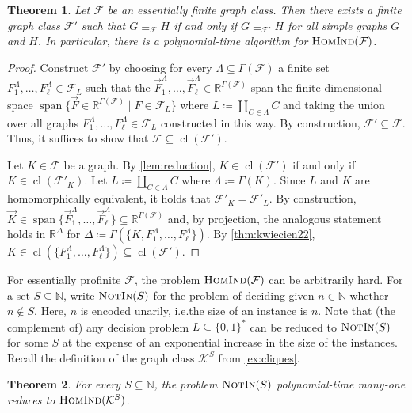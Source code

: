 \documentclass[3p,final]{elsarticle}
\DeclareMathOperator{\spn}{span}
\newcommand{\HomInd}{\textup{\textsc{HomInd}}}
\newcommand{\Mem}{\textup{\textsc{NotIn}}}
\DeclareMathOperator{\cl}{cl}
\newtheorem{theorem}{Theorem}
\begin{document}
	\begin{theorem} \label{thm:finite}
		Let $\mathcal{F}$ be an essentially finite graph class. 
		Then there exists a finite graph class $\mathcal{F}'$ such that $G \equiv_{\mathcal{F}} H$ if and only if $G \equiv_{\mathcal{F}'} H$ for all simple graphs $G$ and $H$.
		In particular, there is a polynomial-time algorithm for $\HomInd(\mathcal{F})$.
	\end{theorem}
	\begin{proof}Construct $\mathcal{F}'$ by choosing for every $\Lambda \subseteq \Gamma(\mathcal{F})$ a
		finite set $F_1^\Lambda, \dots, F_\ell^\Lambda \in \mathcal{F}_L$ such that the 
		$\vec{F}_1^\Lambda, \dots, \vec{F}_\ell^\Lambda \in \mathbb{R}^{\Gamma(\mathcal{F})}$ span the finite-dimensional space $\spn\{\vec{F} \in \mathbb{R}^{\Gamma(\mathcal{F})} \mid F \in \mathcal{F}_L\}$
		where $L \coloneqq \coprod_{C \in \Lambda} C$ and taking the union over all graphs $F_1^\Lambda, \dots, F_\ell^\Lambda \in \mathcal{F}_L$ constructed in this way. By construction, $\mathcal{F}' \subseteq \mathcal{F}$. Thus, it suffices to show that $\mathcal{F} \subseteq \cl(\mathcal{F}')$.
		
		Let $K \in \mathcal{F}$ be a graph. 
		By \cref{lem:reduction}, $K \in \cl(\mathcal{F}')$ if and only if $K \in \cl(\mathcal{F}'_K)$.
		Let $L \coloneqq \coprod_{C \in \Lambda} C$ where $\Lambda \coloneqq \Gamma(K)$. Since $L$ and $K$ are homomorphically equivalent, it holds that $\mathcal{F}'_K = \mathcal{F}'_L$.
		By construction, $\vec{K} \in \spn \{\vec{F}_1^\Lambda, \dots, \vec{F}_\ell^\Lambda\} \subseteq \mathbb{R}^{\Gamma(\mathcal{F})}$ and, by projection, the analogous statement holds in $\mathbb{R}^{\Delta}$ for $\Delta \coloneqq \Gamma(\{K, F_1^\Lambda, \dots, F_\ell^\Lambda\})$.
		By \cref{thm:kwiecien22}, $K \in \cl(\{F_1^{\Lambda}, \dots, F_\ell^{\Lambda}\}) \subseteq \cl(\mathcal{F}')$.
	\end{proof}
	For essentially profinite $\mathcal{F}$, the problem $\HomInd(\mathcal{F})$ can be arbitrarily hard.
	For a set $S \subseteq \mathbb{N}$, write $\Mem(S)$ for the problem of deciding given $n \in \mathbb{N}$ whether $n \not\in S$.
	Here, $n$ is encoded unarily, i.e.\@ the size of an instance is $n$. 
	Note that (the complement of) any decision problem $L \subseteq \{0,1\}^*$ can be reduced to $\Mem(S)$ for some $S$ at the expense of an exponential increase in the size of the instances.
	Recall the definition of the graph class $\mathcal{K}^S$ from \cref{ex:cliques}.
	
	
	\begin{theorem} \label{thm:complexity-profinite}
		For every $S \subseteq \mathbb{N}$, the problem $\Mem(S)$ polynomial-time many-one reduces to $\HomInd(\mathcal{K}^S)$.
	\end{theorem}
	
\end{document}

